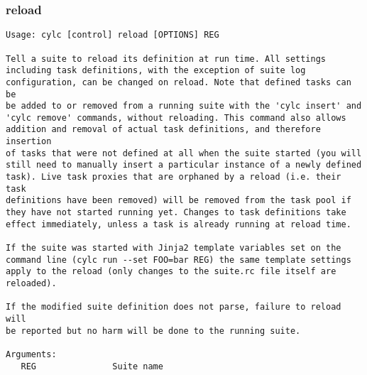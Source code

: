 \subsubsection{reload}
\label{reload}
\begin{lstlisting}
Usage: cylc [control] reload [OPTIONS] REG 

Tell a suite to reload its definition at run time. All settings
including task definitions, with the exception of suite log
configuration, can be changed on reload. Note that defined tasks can be
be added to or removed from a running suite with the 'cylc insert' and
'cylc remove' commands, without reloading. This command also allows
addition and removal of actual task definitions, and therefore insertion
of tasks that were not defined at all when the suite started (you will
still need to manually insert a particular instance of a newly defined
task). Live task proxies that are orphaned by a reload (i.e. their task
definitions have been removed) will be removed from the task pool if
they have not started running yet. Changes to task definitions take
effect immediately, unless a task is already running at reload time.

If the suite was started with Jinja2 template variables set on the
command line (cylc run --set FOO=bar REG) the same template settings
apply to the reload (only changes to the suite.rc file itself are
reloaded).

If the modified suite definition does not parse, failure to reload will
be reported but no harm will be done to the running suite.

Arguments:
   REG               Suite name


\end{lstlisting}
